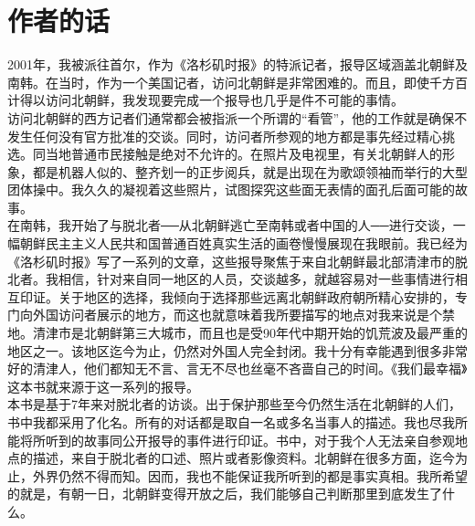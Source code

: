 \fancyhead[RO]{{\tiny{\textcolor{Gray}{\FA \ }}}\thepage}
\fancyhead[LE]{{\tiny{\textcolor{Gray}{\FA \ }}}\thepage}
\fancyfoot[LE,RO]{}
\fancyfoot[LO,CE]{}
\fancyfoot[CO,RE]{}
\chapter*{作者的话}
2001年，我被派往首尔，作为《洛杉矶时报》的特派记者，报导区域涵盖北朝鲜及南韩。在当时，作为一个美国记者，访问北朝鲜是非常困难的。而且，即使千方百计得以访问北朝鲜，我发现要完成一个报导也几乎是件不可能的事情。\\

访问北朝鲜的西方记者们通常都会被指派一个所谓的“看管”，他的工作就是确保不发生任何没有官方批准的交谈。同时，访问者所参观的地方都是事先经过精心挑选。同当地普通市民接触是绝对不允许的。在照片及电视里，有关北朝鲜人的形象，都是机器人似的、整齐划一的正步阅兵，就是出现在为歌颂领袖而举行的大型团体操中。我久久的凝视着这些照片，试图探究这些面无表情的面孔后面可能的故事。\\

在南韩，我开始了与脱北者──从北朝鲜逃亡至南韩或者中国的人──进行交谈，一幅朝鲜民主主义人民共和国普通百姓真实生活的画卷慢慢展现在我眼前。我已经为《洛杉矶时报》写了一系列的文章，这些报导聚焦于来自北朝鲜最北部清津市的脱北者。我相信，针对来自同一地区的人员，交谈越多，就越容易对一些事情进行相互印证。关于地区的选择，我倾向于选择那些远离北朝鲜政府朝所精心安排的，专门向外国访问者展示的地方，而这也就意味着我所要描写的地点对我来说是个禁地。清津市是北朝鲜第三大城市，而且也是受90年代中期开始的饥荒波及最严重的地区之一。该地区迄今为止，仍然对外国人完全封闭。我十分有幸能遇到很多非常好的清津人，他们都知无不言、言无不尽也丝毫不吝啬自己的时间。《我们最幸福》这本书就来源于这一系列的报导。\\

本书是基于7年来对脱北者的访谈。出于保护那些至今仍然生活在北朝鲜的人们，书中我都采用了化名。所有的对话都是取自一名或多名当事人的描述。我也尽我所能将所听到的故事同公开报导的事件进行印证。书中，对于我个人无法亲自参观地点的描述，来自于脱北者的口述、照片或者影像资料。北朝鲜在很多方面，迄今为止，外界仍然不得而知。因而，我也不能保证我所听到的都是事实真相。我所希望的就是，有朝一日，北朝鲜变得开放之后，我们能够自己判断那里到底发生了什么。\\